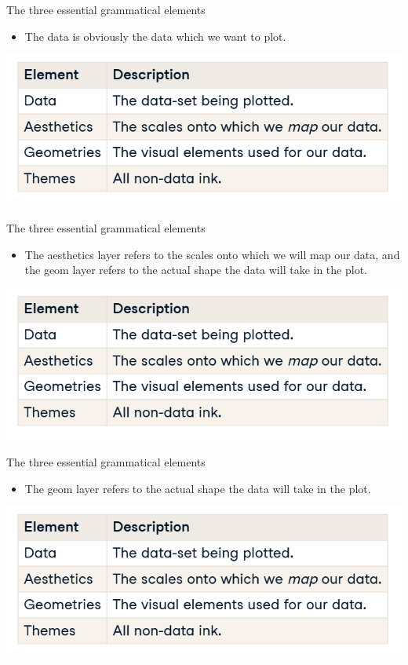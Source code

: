 \documentclass[
  ignorenonframetext,
]{beamer}
\providecommand{\tightlist}{%
  \setlength{\itemsep}{0pt}\setlength{\parskip}{0pt}}
\begin{document}
\begin{frame}{The three essential grammatical elements}
\label{the-three-essential-grammatical-elements-2}
\begin{itemize}
\tightlist
\item
  The data is obviously the data which we want to plot.
\end{itemize}

\includegraphics{../images/im123.png}
\end{frame}

\begin{frame}{The three essential grammatical elements}
\label{the-three-essential-grammatical-elements-3}
\begin{itemize}
\tightlist
\item
  The aesthetics layer refers to the scales onto which we will map our
  data, and the geom layer refers to the actual shape the data will take
  in the plot.
\end{itemize}

\includegraphics{../images/im123.png}
\end{frame}

\begin{frame}{The three essential grammatical elements}
\label{the-three-essential-grammatical-elements-4}
\begin{itemize}
\tightlist
\item
  The geom layer refers to the actual shape the data will take in the
  plot.
\end{itemize}

\includegraphics{../images/im123.png}
\end{frame}
\end{document}
